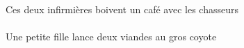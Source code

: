 \begin{exe}
\ex\gll
\DEFPlObl{}   \chasseurCPlObl{}   \AVEC{}   \DEMDuErg{}   \infirmiereBDuErg{}   \INDSgAbs{}   \cafeDSgAbs{}  \boireVtPrsDSg{}\\
\DEFPlOblP{}   \chasseurCPlOblP{}   \AVECP{}   \DEMDuErgP{}   \infirmiereBDuErgP{}   \INDSgAbsP{}   \cafeDSgAbsP{}  \boireVtPrsDSgP{}\\
Ces deux infirmières boivent un café avec les chasseurs
\ex\gll
\INDSgErg{}   \petitCSg{}   \filleCSgErg{}    \DEFSgDat{}   \grosASg{}   \coyoteASgDat{}   \INDDuAbs{}   \viandeADuAbs{}  \lancerVdPrsADu{}\\
\INDSgErgP{}   \petitCSgP{}   \filleCSgErgP{}    \DEFSgDatP{}   \grosASgP{}   \coyoteASgDatP{}   \INDDuAbsP{}   \viandeADuAbsP{}  \lancerVdPrsADuP{}\\
Une petite fille lance deux viandes au gros coyote
\end{exe}
